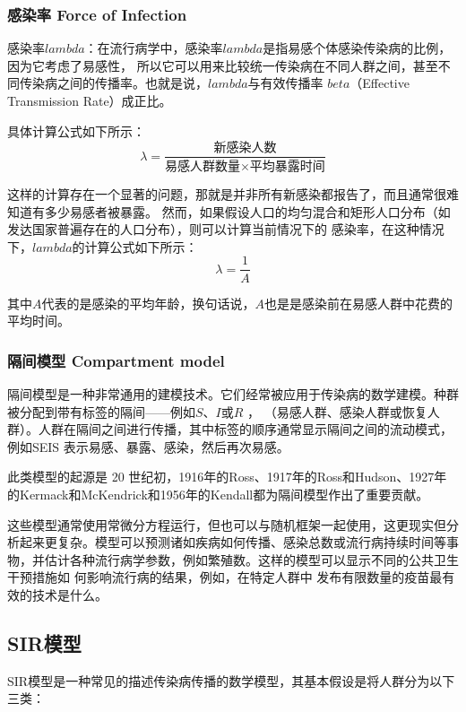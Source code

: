 \documentclass[bwprint]{gmcmthesis}
\numberwithin{figure}{section}
\begin{document}
\subsubsection{感染率 Force of Infection}
\par 感染率$lambda$：在流行病学中，感染率$lambda$是指易感个体感染传染病的比例，因为它考虑了易感性，
所以它可以用来比较统一传染病在不同人群之间，甚至不同传染病之间的传播率。也就是说，$lambda$与有效传播率
$beta$（Effective Transmission Rate）成正比。
\par 具体计算公式如下所示：
\begin{equation} \label{}
    \lambda =\frac{\text{新感染人数}}{\text{易感人群数量}\times \text{平均暴露时间}}
\end{equation}

\par 这样的计算存在一个显著的问题，那就是并非所有新感染都报告了，而且通常很难知道有多少易感者被暴露。
然而，如果假设人口的均匀混合和矩形人口分布（如发达国家普遍存在的人口分布），则可以计算当前情况下的
感染率，在这种情况下，$lambda$的计算公式如下所示：
\begin{equation} \label{}
    \lambda =\dfrac{1}{A}
\end{equation}
\par 其中$A$代表的是感染的平均年龄，换句话说，$A$也是是感染前在易感人群中花费的平均时间。


\subsubsection{隔间模型 Compartment model}
\par 隔间模型是一种非常通用的建模技术。它们经常被应用于传染病的数学建模。种群被分配到带有标签的隔间——例如$S$、$I$或$R$ ，
（易感人群、感染人群或恢复人群）。人群在隔间之间进行传播，其中标签的顺序通常显示隔间之间的流动模式，例如SEIS 表示易感、暴露、感染，然后再次易感。
\par 此类模型的起源是 20 世纪初，1916年的Ross、1917年的Ross和Hudson、1927年的Kermack和McKendrick和1956年的Kendall都为隔间模型作出了重要贡献。
\par 这些模型通常使用常微分方程运行，但也可以与随机框架一起使用，这更现实但分析起来更复杂。模型可以预测诸如疾病如何传播、感染总数或流行病持续时间等事物，并估计各种流行病学参数，例如繁殖数。这样的模型可以显示不同的公共卫生干预措施如
何影响流行病的结果，例如，在特定人群中 发布有限数量的疫苗最有效的技术是什么。


\subsection{SIR模型}
SIR模型是一种常见的描述传染病传播的数学模型，其基本假设是将人群分为以下三类：
\end{document}
